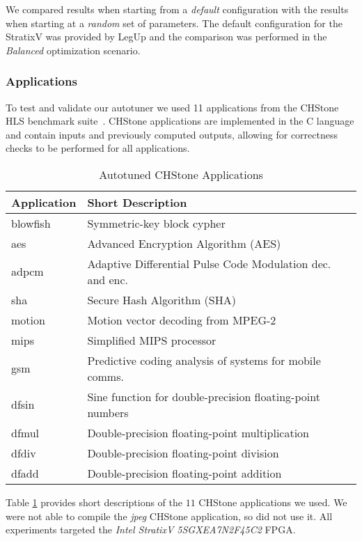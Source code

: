 We compared results when starting from a \textit{default} configuration with
the results when starting at a \textit{random} set of parameters. The default
configuration for the StratixV was provided by LegUp and the comparison was
performed in the \textit{Balanced} optimization scenario.

\subsubsection{Applications}

To test and validate our autotuner we used 11 applications from the CHStone HLS
benchmark suite~\cite{hara2008chstone}. CHStone applications are implemented in
the C language and contain inputs and previously computed outputs, allowing for
correctness checks to be performed for all applications.

\begin{table}[htpb]
\centering
\begin{tabular}{@{}p{}p{}@{}}
\toprule
 Application & Short Description \\ \midrule
 blowfish & Symmetric-key block cypher \\
 aes & Advanced Encryption Algorithm (AES) \\
 adpcm & Adaptive Differential Pulse Code Modulation dec. and enc. \\
 sha & Secure Hash Algorithm (SHA) \\
 motion & Motion vector decoding from MPEG-2 \\
 mips & Simplified MIPS processor \\
 gsm & Predictive coding analysis of systems for mobile comms. \\
 dfsin & Sine function for double-precision floating-point numbers \\
 dfmul & Double-precision floating-point multiplication \\
 dfdiv & Double-precision floating-point division \\
 dfadd & Double-precision floating-point addition \\ \bottomrule
\end{tabular}
\caption{Autotuned CHStone Applications}
\label{tab:chstone}
\end{table}

Table \ref{tab:chstone} provides short descriptions of the $11$ CHStone
applications we used. We were not able to compile the \textit{jpeg} CHStone
application, so did not use it.  All experiments targeted the \textit{Intel
StratixV 5SGXEA7N2F45C2} FPGA.

